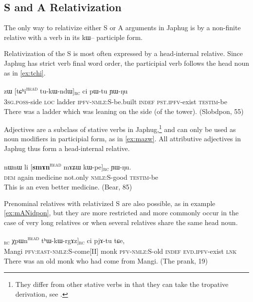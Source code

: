 \documentclass[oldfontcommands,oneside,a4paper,11pt]{article}
\newcommand{\ipa}[1]{{\phon #1}} %
\newcommand{\tete}{\textsuperscript{\textsc{head}}}
\newcommand{\rc}{\textsubscript{\textsc{rc}}}
\begin{document}
\subsection{S and A Relativization}
The only way to relativize either S or A arguments in Japhug is by a non-finite relative with a verb in its \ipa{kɯ--} participle form. 

Relativization of the S is most often expressed by a head-internal relative. Since Japhug has strict verb final word order,  the participial verb follows the head noun as in \ref{ex:tchi}.

 \begin{exe}
   \ex   \label{ex:tchi}
 \gll  	\ipa{ɯ-ɣmbɤj}  	\ipa{zɯ}  	[\ipa{tɕʰi}\tete{}  	\ipa{tu-kɯ-ndɯ}]\rc{}  	\ipa{ci}  	\ipa{pɯ-tu}  	\ipa{ɲɯ-ŋu}  		\\
\textsc{3sg.poss}-side \textsc{loc} ladder \textsc{ipfv-nmlz:S}-be.built  \textsc{indef} \textsc{pst.ipfv}-exist \textsc{testim}-be  \\
 \glt    There was a ladder which was leaning on the side (of the tower). (Slobdpon, 55)
   \end{exe} 

Adjectives are a subclass of stative verbs in Japhug,\footnote{They differ from other stative verbs in that they can take the tropative derivation, see \citet{jacques13tropative}. } and can only be used as noun modifiers in participial form, as in \ref{ex:mazw}. All attributive adjectives in Japhug thus form a head-internal relative.

 \begin{exe}
   \ex   \label{ex:mazw}
 \gll 
\ipa{nɯnɯ}  	\ipa{li}  	[\textbf{\ipa{smɤn}}\tete{}   	\ipa{mɤʑɯ}  	\ipa{kɯ-pe}]\rc{}  	\ipa{ɲɯ-ŋu.}  \\
\textsc{dem} again medicine not.only \textsc{nmlz:S}-good \textsc{testim}-be \\
 \glt    This is an even better medicine. (Bear, 85)
   \end{exe} 

Prenominal relatives with relativized S are also possible, as in example  \ref{ex:mANidpon}, but they are more restricted and more commonly occur in the case of very long relatives or when several relatives share the same head noun.

\begin{exe}
   \ex  \label{ex:mANidpon}
\gll [[\ipa{mɤŋi}  	\ipa{kɤ-kɯ-ɣe}]\rc{}  	\ipa{χpɯn}\tete{}  	\ipa{tʰɯ-kɯ-rgɤz}]\rc{}  	\ipa{ci}  	\ipa{pjɤ-tu}  	\ipa{tɕe,}    	\\
Mangi \textsc{pfv:east-nmlz:S}-come[II] monk \textsc{pfv-nmlz:S}-old \textsc{indef} \textsc{evd.ipfv}-exist   \textsc{lnk} \\
 \glt  There was an old monk who had come from Mangi. (The prank, 19)
   \end{exe} 
\end{document}
